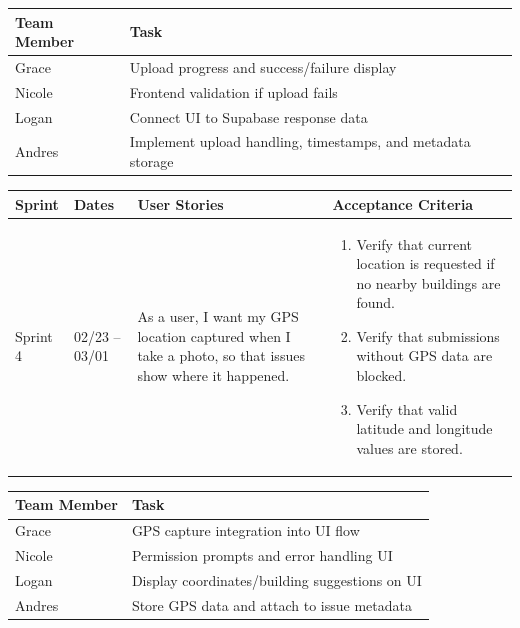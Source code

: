 \documentclass[12pt]{article}
\begin{document}
\vspace{0.5em}

\noindent
\begin{tabular}{|L{2.5cm}|L{12.5cm}|}
\hline
\textbf{Team Member} & \textbf{Task} \\
\hline
Grace & Upload progress and success/failure display \\
\hline
Nicole & Frontend validation if upload fails \\
\hline
Logan & Connect UI to Supabase response data \\
\hline
Andres & Implement upload handling, timestamps, and metadata storage \\
\hline
\end{tabular}

\vspace{2em}


\vspace{0.5em}

\noindent
\begin{tabular}{|L{1.2cm}|L{1.8cm}|L{5.2cm}|L{6.3cm}|}
\hline
\textbf{Sprint} & \textbf{Dates} & \textbf{User Stories} & \textbf{Acceptance Criteria} \\
\hline
Sprint 4 & 02/23 -- 03/01 &
As a user, I want my GPS location captured when I take a photo, so that issues show where it happened. &
\begin{enumerate}
    \item Verify that current location is requested if no nearby buildings are found.
    \item Verify that submissions without GPS data are blocked.
    \item Verify that valid latitude and longitude values are stored.
\end{enumerate} \\
\hline
\end{tabular}

\vspace{0.5em}

\noindent
\begin{tabular}{|L{2.5cm}|L{12.5cm}|}
\hline
\textbf{Team Member} & \textbf{Task} \\
\hline
Grace & GPS capture integration into UI flow \\
\hline
Nicole & Permission prompts and error handling UI \\
\hline
Logan & Display coordinates/building suggestions on UI \\
\hline
Andres & Store GPS data and attach to issue metadata \\
\hline
\end{tabular}
\end{document}
